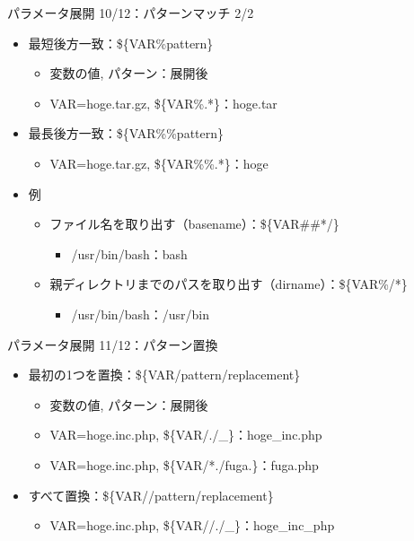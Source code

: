 \documentclass[12pt,aspectratio=169]{beamer}
\begin{document}
\begin{frame}{パラメータ展開 10/12：パターンマッチ 2/2}

  \begin{itemize}
    \item 最短後方一致：\$\{VAR\%pattern\}
      \begin{itemize}
        \item 変数の値, パターン：展開後
        \item VAR=hoge.tar.gz, \$\{VAR\%.*\}：hoge.tar
      \end{itemize}
    \item 最長後方一致：\$\{VAR\%\%pattern\}
      \begin{itemize}
        \item VAR=hoge.tar.gz, \$\{VAR\%\%.*\}：hoge
      \end{itemize}

    \item 例
      \begin{itemize}
        \item ファイル名を取り出す（basename）：\$\{VAR\#\#*/\}
          \begin{itemize}
            \item /usr/bin/bash：bash
          \end{itemize}
        \item 親ディレクトリまでのパスを取り出す（dirname）：\$\{VAR\%/*\}
          \begin{itemize}
            \item /usr/bin/bash：/usr/bin
          \end{itemize}

      \end{itemize}

  \end{itemize}

\end{frame}


\begin{frame}{パラメータ展開 11/12：パターン置換}

  \begin{itemize}
    \item 最初の1つを置換：\$\{VAR/pattern/replacement\}
      \begin{itemize}
        \item 変数の値, パターン：展開後
        \item VAR=hoge.inc.php, \$\{VAR/./\_\}：hoge\_inc.php
        \item VAR=hoge.inc.php, \$\{VAR/*./fuga.\}：fuga.php
      \end{itemize}
    \item すべて置換：\$\{VAR//pattern/replacement\}
      \begin{itemize}
        \item VAR=hoge.inc.php, \$\{VAR//./\_\}：hoge\_inc\_php
      \end{itemize}

  \end{itemize}

\end{frame}
\end{document}
